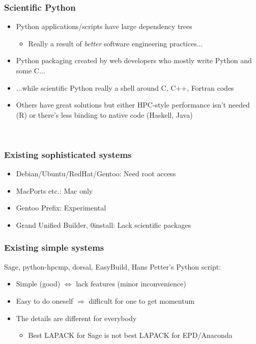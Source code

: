 \documentclass[sans,mathserif]{beamer}
\begin{document}
\begin{frame}
  \frametitle{Scientific Python}

  \begin{itemize}
  \item<+-> Python applications/scripts have large dependency trees
    \begin{itemize}
    \item Really a result of {\em better} software engineering practices...
    \end{itemize}

  \item<+-> Python packaging created by web developers who mostly write Python and some C...

  \item<+-> ...while scientific Python really a shell around C, C++, Fortran codes

  \item<+-> Others have great solutions but either HPC-style performance isn't needed (R)
    or there's less binding to native code (Haskell, Java)

  \end{itemize}

~


\end{frame}

\begin{frame}
  \frametitle{Existing sophisticated systems}

  \begin{itemize}
  \item<+-> Debian/Ubuntu/RedHat/Gentoo: Need root access
  \item<+-> MacPorts etc.: Mac only
  \item<+-> Gentoo Prefix: Experimental
  \item<+-> Grand Unified Builder, 0install: Lack scientific packages
  \end{itemize}

\end{frame}

\begin{frame}
  \frametitle{Existing simple systems}
  Sage, python-hpcmp, dorsal, EasyBuild, Hans Petter's Python script:

  \begin{itemize}
  \item<+-> Simple (good) $\Leftrightarrow$ lack features (minor inconvenience)
  \item<+-> Easy to do oneself $\Rightarrow$ difficult for one to get
    momentum
  \item<+-> The details are different for everybody
   \begin{itemize}
    \item Best LAPACK for Sage is not best LAPACK for EPD/Anaconda
    \end{itemize}
  \end{itemize}
\end{frame}
\end{document}

